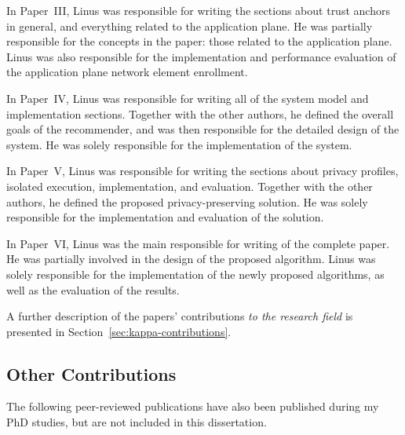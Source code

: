 In Paper~III, Linus was responsible for writing the sections about trust anchors in general, and everything related to the application plane.
He was partially responsible for the concepts in the paper: those related to the application plane.
Linus was also responsible for the implementation and performance evaluation of the application plane network element enrollment.

In Paper~IV, Linus was responsible for writing all of the system model and implementation sections.
Together with the other authors, he defined the overall goals of the recommender, and was then responsible for the detailed design of the system.
He was solely responsible for the implementation of the system.

In Paper~V, Linus was responsible for writing the sections about privacy profiles, isolated execution, implementation, and evaluation.
Together with the other authors, he defined the proposed privacy-preserving solution.
He was solely responsible for the implementation and evaluation of the solution.

In Paper~VI, Linus was the main responsible for writing of the complete paper.
He was partially involved in the design of the proposed algorithm.
Linus was solely responsible for the implementation of the newly proposed algorithms, as well as the evaluation of the results.

A further description of the papers' contributions \emph{to the research field} is presented in Section~\ref{sec:kappa-contributions}.

\newpage
\subsection*{Other Contributions}

The following peer-reviewed publications have also been published during my PhD studies, but are not included in this dissertation.

